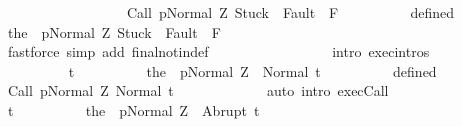 \begin{isabellebody}
\ \ \ \ \ \ \isamarkupfalse%
\ {\isacharminus}\isanewline
\ \ \ \ \ \ \ \ \isamarkupfalse%
\ {\isachardoublequoteopen}{\isasymGamma}{\isasymturnstile}{\isasymlangle}Call\ p{\isacharcomma}Normal\ Z{\isasymrangle}\ {\isasymRightarrow}{\isasymnotin}{\isacharparenleft}{\isacharbraceleft}Stuck{\isacharbraceright}\ {\isasymunion}\ Fault\ {\isacharbackquote}\ {\isacharparenleft}{\isacharminus}F{\isacharparenright}{\isacharparenright}{\isachardoublequoteclose}\isanewline
\ \ \ \ \ \ \ \ \isamarkupfalse%
\ defined\ \isamarkupfalse%
\ {\isachardoublequoteopen}{\isasymGamma}{\isasymturnstile}{\isasymlangle}the\ {\isacharparenleft}{\isasymGamma}\ p{\isacharparenright}{\isacharcomma}Normal\ Z{\isasymrangle}\ {\isasymRightarrow}{\isasymnotin}{\isacharparenleft}{\isacharbraceleft}Stuck{\isacharbraceright}\ {\isasymunion}\ Fault\ {\isacharbackquote}\ {\isacharparenleft}{\isacharminus}F{\isacharparenright}{\isacharparenright}{\isachardoublequoteclose}\ \isanewline
\ \ \ \ \ \ \ \ \ \ \isamarkupfalse%
\ {\isacharparenleft}fastforce\ simp\ add{\isacharcolon}\ final{\isacharunderscore}notin{\isacharunderscore}def\ \isanewline
\ \ \ \ \ \ \ \ \ \ \ \ \ \ \ \ intro{\isacharcolon}\ exec{\isachardot}intros{\isacharparenright}\isanewline
\ \ \ \ \ \ \isamarkupfalse%
\isanewline
\ \ \ \ \ \ \ \ \isamarkupfalse%
\ t\isanewline
\ \ \ \ \ \ \ \ \isamarkupfalse%
\ {\isachardoublequoteopen}{\isasymGamma}{\isasymturnstile}{\isasymlangle}the\ {\isacharparenleft}{\isasymGamma}\ p{\isacharparenright}{\isacharcomma}Normal\ Z{\isasymrangle}\ {\isasymRightarrow}\ Normal\ t{\isachardoublequoteclose}\isanewline
\ \ \ \ \ \ \ \ \isamarkupfalse%
\ defined\ \isanewline
\ \ \ \ \ \ \ \ \isamarkupfalse%
\ {\isachardoublequoteopen}{\isasymGamma}{\isasymturnstile}{\isasymlangle}Call\ p{\isacharcomma}Normal\ Z{\isasymrangle}\ {\isasymRightarrow}Normal\ t{\isachardoublequoteclose}\isanewline
\ \ \ \ \ \ \ \ \ \ \isamarkupfalse%
\ \ {\isacharparenleft}auto\ intro{\isacharcolon}\ exec{\isachardot}Call{\isacharparenright}\isanewline
\ \ \ \ \ \ \isamarkupfalse%
\isanewline
\ \ \ \ \ \ \ \ \isamarkupfalse%
\ t\isanewline
\ \ \ \ \ \ \ \ \isamarkupfalse%
\ {\isachardoublequoteopen}{\isasymGamma}{\isasymturnstile}{\isasymlangle}the\ {\isacharparenleft}{\isasymGamma}\ p{\isacharparenright}{\isacharcomma}Normal\ Z{\isasymrangle}\ {\isasymRightarrow}\ Abrupt\ t{\isachardoublequoteclose}\isanewline

\end{isabellebody}
